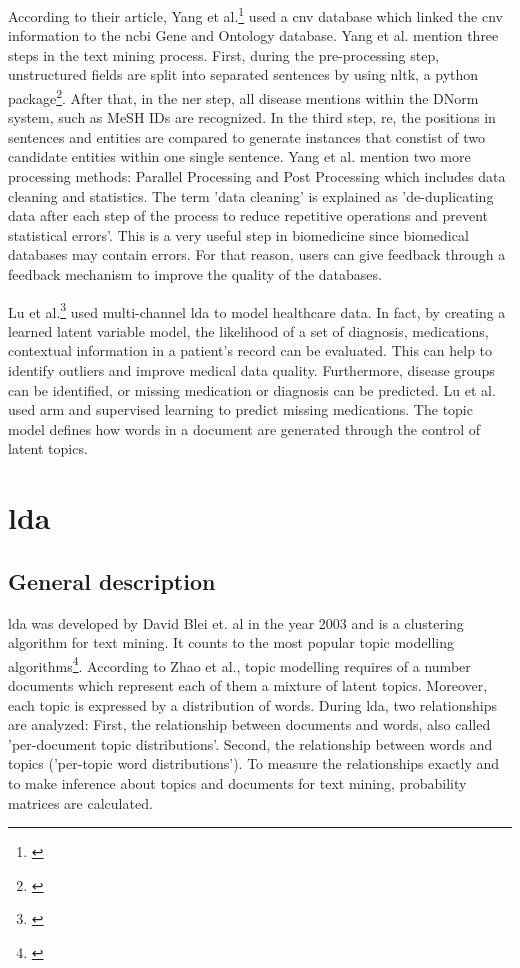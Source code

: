 According to their article, Yang et al.\footnote{\autocite{yang_2018}} used a \gls{cnv} database which linked the \gls{cnv} information to the \gls{ncbi} Gene and Ontology database. Yang et al. mention three steps in the text mining process. First, during the pre-processing step, unstructured fields are split into separated sentences by using \gls{nltk}, a python package\footnote{\autocite{nltk}}. After that, in the \gls{ner} step, all disease mentions within the DNorm system, such as MeSH IDs are recognized. In the third step, \gls{re}, the positions in sentences and entities are compared to generate instances that constist of two candidate entities within one single sentence.
Yang et al. mention two more processing methods: Parallel Processing and Post Processing which includes data cleaning and statistics. The term 'data cleaning' is explained as 'de-duplicating data after each step of the process to reduce repetitive operations and prevent statistical errors'. This is a very useful step in biomedicine since biomedical databases may contain errors. For that reason, users can give feedback through a feedback mechanism to improve the quality of the databases.

Lu et al.\footnote{\autocite{lu_2016}} used multi-channel \gls{lda} to model healthcare data. In fact, by creating a learned latent variable model, the likelihood of a set of diagnosis, medications, contextual information in a patient's record can be evaluated. This can help to identify outliers and improve medical data quality. Furthermore, disease groups can be identified,  or missing medication or diagnosis can be predicted. Lu et al. used \gls{arm} and supervised learning to predict missing medications. The topic model defines how words in a document are generated through the control of latent topics.

\chapter{\gls{lda}}\label{lda}
\section{General description}\label{lda_description}
\gls{lda} was developed by David Blei et. al in the year 2003 and is a clustering algorithm for text mining. It counts to the most popular topic modelling algorithms\footnote{\autocite{zhao_2016}}.
According to Zhao et al., topic modelling requires of a number documents which represent each of them a mixture of latent topics. Moreover, each topic is expressed by a distribution of words. During \gls{lda}, two relationships are analyzed: First, the relationship between documents and words, also called 'per-document topic distributions'. Second, the relationship between words and topics ('per-topic word distributions'). To measure the relationships exactly and to make inference about topics and documents for text mining, probability matrices are calculated.

